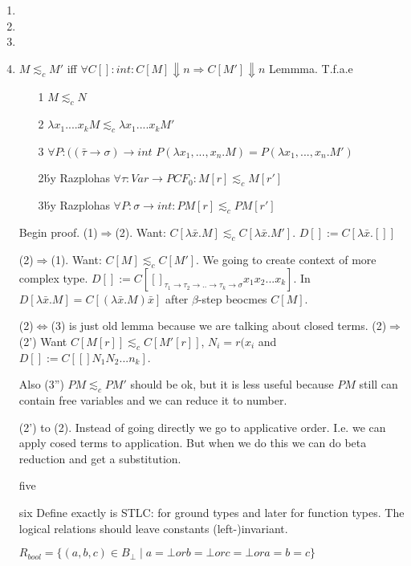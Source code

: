 \documentclass[a4paper,10pt]{book}
\newcommand{\rarr}{ \rightarrow }
\begin{document}
\begin{enumerate}
 \item 
 \item 
 \item 
 \item $M\lesssim_c M' $ iff $\forall C[]: int: C[M] \Downarrow n \Rightarrow C[M'] \Downarrow n$
  Lemmma. T.f.a.e
  \begin{enumerate}
  \item[1] $M \lesssim_c N$
  \item[2] $\lambda x_1 .... x_k M \lesssim_c \lambda x_1 .... x_k M'$
  \item[3] $\forall P: ((\bar\tau \rarr \sigma) \rarr int$ 
  $P(\lambda x_1,...,x_n . M) = P(\lambda x_1,...,x_n . M')$
  \item[2\' by Razplohas] $\forall \tau: Var \rarr PCF_0: M[r] \lesssim_c M[r']$
  \item[3\' by Razplohas] $\forall P:\sigma \rarr int: PM[r] \lesssim_c PM[r']$
  \end{enumerate}
  
  Begin proof.
  (1)$\Rightarrow$(2). 
  Want: $C[\lambda \bar{x} . M] \lesssim_c C[\lambda \bar{x} . M']$.
  $D[]:=C[\lambda \bar{x}. []]$
  
  (2)$\Rightarrow$(1). 
  Want: $C[M] \lesssim_c C[M']$. We going to create context of more complex type.
  $D[] := C[ []_{\tau_1\rarr\tau_2\rarr ..\rarr\tau_k\rarr\sigma} x_1 x_2... x_k]$.
  In $D[\lambda\bar{x}.M] = C[(\lambda\bar{x}.M) \bar{x}]$ after $\beta$-step beocmes $C[M]$.
  
  (2)$\Leftrightarrow$(3) is just old lemma because we are talking about closed terms.
  (2)$\Rightarrow$(2') 
  Want $C[M[r]] \lesssim_c C[M'[r]]$, $N_i = r(x_i$ and $D[]:=C[[]N_1 N_2 ... n_k]$.
  
  
  Also (3'') $PM \lesssim_c PM'$ should be ok, but it is less useful because $PM$ still can contain 
  free variables and we can reduce it to number.
  
  (2') to (2). Instead of going directly we go to applicative order. I.e. we can apply cosed terms 
  to application. But when we do this we can do beta reduction and get  a substitution.
  \item [five]
  \item [six] Define exactly is STLC: for ground types and later for function types. The logical
  relations should leave constants (left-)invariant.
  
  $R_{bool} = \{ (a,b,c)\in B_\bot \mid a=\bot or b=\bot or c=\bot or a=b=c \}$
  

\end{enumerate}
\end{document}
